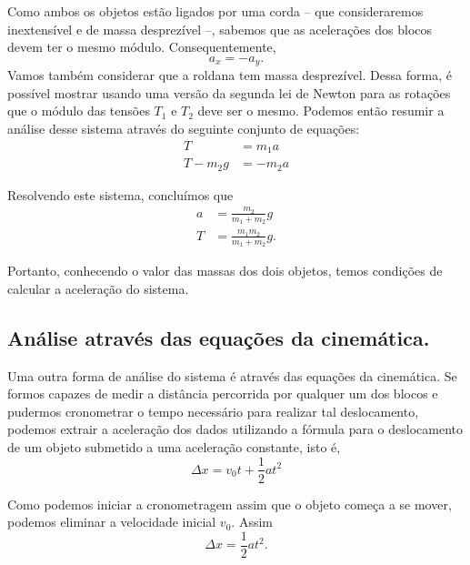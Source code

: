 Como ambos os objetos estão ligados por uma corda -- que consideraremos inextensível e de massa desprezível --, sabemos que as acelerações dos blocos devem ter o mesmo módulo. Consequentemente,
	\begin{equation}
		a_x = -a_y.
	\end{equation}
%
Vamos também considerar que a roldana tem massa desprezível. Dessa forma, é possível mostrar usando uma versão da segunda lei de Newton para as rotações que o módulo das tensões $T_1$ e $T_2$ deve ser o mesmo. Podemos então resumir a análise desse sistema através do seguinte conjunto de equações:
\begin{align}
	T &= m_1 a\\
	T-m_2g &= -m_2 a
\end{align}

Resolvendo este sistema, concluímos que
\begin{align}
	a &= \frac{m_2}{m_1 + m_2} g \label{EqAceleracao}\\
	T &= \frac{m_1m_2}{m_1+m_2}g.
\end{align}

Portanto, conhecendo o valor das massas dos dois objetos, temos condições de calcular a aceleração do sistema.

\subsection{Análise através das equações da cinemática.}

Uma outra forma de análise do sistema é através das equações da cinemática. Se formos capazes de medir a distância percorrida por qualquer um dos blocos e pudermos cronometrar o tempo necessário para realizar tal deslocamento, podemos extrair a aceleração dos dados utilizando a fórmula para o deslocamento de um objeto submetido a uma aceleração constante, isto é,
	\begin{equation}
		\Delta x = v_0 t + \frac{1}{2} at^2
	\end{equation}

Como podemos iniciar a cronometragem assim que o objeto começa a se mover, podemos eliminar a velocidade inicial $v_0$. Assim
\begin{equation}
	\Delta x = \frac{1}{2} at^2.
\end{equation}

